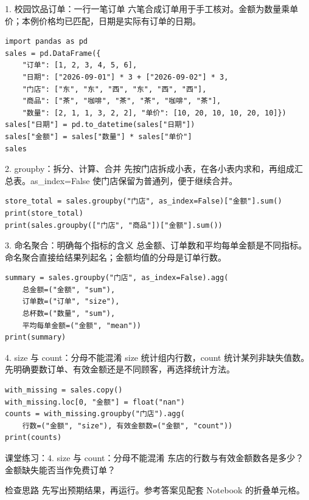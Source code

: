 \begin{frame}[fragile]{1. 校园饮品订单：一行一笔订单}
\small 六笔合成订单用于手工核对。金额为数量乘单价；本例价格均已匹配，日期是实际有订单的日期。
\medskip
\begin{lstlisting}
import pandas as pd
sales = pd.DataFrame({
    "订单": [1, 2, 3, 4, 5, 6],
    "日期": ["2026-09-01"] * 3 + ["2026-09-02"] * 3,
    "门店": ["东", "东", "西", "东", "西", "西"],
    "商品": ["茶", "咖啡", "茶", "茶", "咖啡", "茶"],
    "数量": [2, 1, 1, 3, 2, 2], "单价": [10, 20, 10, 10, 20, 10]})
sales["日期"] = pd.to_datetime(sales["日期"])
sales["金额"] = sales["数量"] * sales["单价"]
sales
\end{lstlisting}
\end{frame}

\begin{frame}[fragile]{2. groupby：拆分、计算、合并}
\small 先按门店拆成小表，在各小表内求和，再组成汇总表。as\_index=False 使门店保留为普通列，便于继续合并。
\medskip
\begin{lstlisting}
store_total = sales.groupby("门店", as_index=False)["金额"].sum()
print(store_total)
print(sales.groupby(["门店", "商品"])["金额"].sum())
\end{lstlisting}
\end{frame}

\begin{frame}[fragile]{3. 命名聚合：明确每个指标的含义}
\small 总金额、订单数和平均每单金额是不同指标。命名聚合直接给结果列起名；金额均值的分母是订单行数。
\medskip
\begin{lstlisting}
summary = sales.groupby("门店", as_index=False).agg(
    总金额=("金额", "sum"),
    订单数=("订单", "size"),
    总杯数=("数量", "sum"),
    平均每单金额=("金额", "mean"))
print(summary)
\end{lstlisting}
\end{frame}

\begin{frame}[fragile]{4. size 与 count：分母不能混淆}
\small size 统计组内行数，count 统计某列非缺失值数。先明确要数订单、有效金额还是不同顾客，再选择统计方法。
\medskip
\begin{lstlisting}
with_missing = sales.copy()
with_missing.loc[0, "金额"] = float("nan")
counts = with_missing.groupby("门店").agg(
    行数=("金额", "size"), 有效金额数=("金额", "count"))
print(counts)
\end{lstlisting}
\end{frame}
\begin{frame}[fragile]{课堂练习：4. size 与 count：分母不能混淆}
东店的行数与有效金额数各是多少？金额缺失能否当作免费订单？
\medskip
\begin{block}{检查思路}
先写出预期结果，再运行。参考答案见配套 Notebook 的折叠单元格。
\end{block}
\end{frame}

